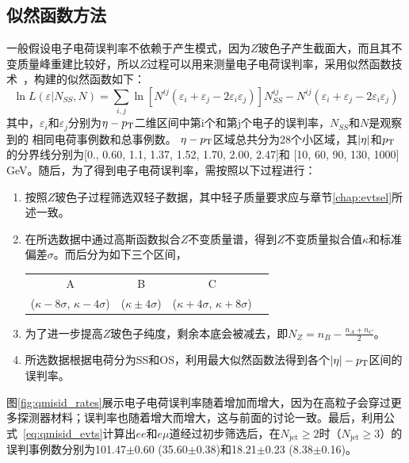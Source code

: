 \subsection{似然函数方法}
一般假设电子电荷误判率不依赖于产生模式，因为$Z$玻色子产生截面大，而且其不变质量峰重建比较好，所以$Z$过程可以用来测量电子电荷误判率，采用似然函数技术~\cite{Likelihoodnote}，构建的似然函数如下：
\begin{equation}
\ln L(\varepsilon|N_{SS},N)=\sum_{i,j}\ln [N^{ij}(\varepsilon_i+\varepsilon_j-2\varepsilon_i \varepsilon_j)]N^{ij}_{SS}-N^{ij}(\varepsilon_i+\varepsilon_j-2\varepsilon_i \varepsilon_j)
\end{equation}
其中，$\varepsilon_i$和$\varepsilon_j$分别为$\eta-p_{\text{T}}$二维区间中第i个和第j个电子的误判率，$N_{SS}$和$N$是观察到的
相同电荷事例数和总事例数。
$\eta-p_{\text{T}}$区域总共分为28个小区域，其$|\eta|$和$p_{\text{T}}$的分界线分别为[0., 0.60, 1.1, 1.37, 1.52, 1.70, 2.00, 2.47]和
[10, 60, 90, 130, 1000] GeV。随后，为了得到电子电荷误判率，需按照以下过程进行：
\begin{enumerate}
 \item 按照$Z$玻色子过程筛选双轻子数据，其中轻子质量要求应与章节\ref{chap:evtsel}所述一致。
 \item 在所选数据中通过高斯函数拟合$Z$不变质量谱，得到$Z$不变质量拟合值$\kappa$和标准偏差$\sigma$。而后分为如下三个区间，
\begin{table}[h]
\centering
\begin{tabular}{cccc}
\hline
  A  &B  &C  \\
($\kappa-8\sigma$, $\kappa - 4\sigma$)  & ($\kappa \pm 4\sigma$)  & ($\kappa+4\sigma$, $\kappa + 8\sigma$) \\
\hline
\end{tabular}
\end{table}

 \item 为了进一步提高$Z$玻色子纯度，剩余本底会被减去，即$N_Z=n_B-\frac{n_A+n_C}{2}$。
 \item 所选数据根据电荷分为SS和OS，利用最大似然函数法得到各个$|\eta|-p_{\text{T}}$区间的误判率。
\end{enumerate}
图\ref{fig:qmisid_rates}展示电子电荷误判率随着\abseta 增加而增大，因为在高\abseta 粒子会穿过更多探测器材料；误判率也随着\pt 增大而增大，这与前面的讨论一致。最后，利用公式~\ref{eq:qmisid_evts}计算出$ee$和$e\mu$道经过初步筛选后，在$N_{\text{jet}}\ge2$时（$N_{\text{jet}}\ge3$）的误判事例数分别为101.47$\pm$0.60 (35.60$\pm$0.38)和18.21$\pm$0.23 (8.38$\pm$0.16)。
